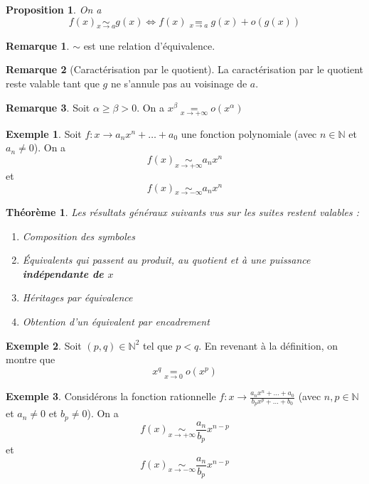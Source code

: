 \documentclass[french]{book}
\newcommand{\N}{\mathbb{N}}
\theoremstyle{plain}
\newtheorem{thm}{Théorème}[chapter]
\newtheorem{prop}{Proposition}[chapter]
\theoremstyle{definition}
\newtheorem{exa}{Exemple}[chapter]
\newtheorem{rmq}{Remarque}[chapter]
\theoremstyle{remark}
\begin{document}
\begin{prop}
	On a $$f(x)\underset{x\to a}{\sim}g(x) \Longleftrightarrow f(x)\underset{x\to a}{=}g(x)+o\left(g(x)\right)$$
\end{prop}
\begin{rmq}
	$\sim$ est une relation d'équivalence.
\end{rmq}
\begin{rmq}[Caractérisation par le quotient]
	La caractérisation par le quotient reste valable tant que $g$ ne s'annule pas au voisinage de $a$.
\end{rmq}
\begin{rmq}
	Soit $\alpha\geqslant\beta>0$. On a $x^\beta \underset{x\to+\infty}{=}o(x^\alpha)$
\end{rmq}
\begin{exa}
	Soit $f:x\rightarrow a_nx^n+\ldots+a_0$ une fonction polynomiale (avec $n\in\N$ et $a_n\ne 0$). On a $$f(x)\underset{x\to+\infty}{\sim}a_nx^n$$ et $$f(x)\underset{x\to-\infty}{\sim}a_nx^n$$
\end{exa}
\begin{thm}
	Les résultats généraux suivants vus sur les suites restent valables :
	\begin{enumerate}
		\item Composition des symboles
		\item Équivalents qui passent au produit, au quotient et à une puissance \textbf{indépendante de $x$}
		\item Héritages par équivalence
		\item Obtention d'un équivalent par encadrement
	\end{enumerate}
\end{thm}
\begin{exa}
	Soit $(p,q)\in\N^2$ tel que $p<q$. En revenant à la définition, on montre que $$x^q\underset{x\to 0}{=}o(x^p)$$
\end{exa}
\begin{exa}
	Considérons la fonction rationnelle $\displaystyle f:x\rightarrow\frac{a_nx^n+\ldots+a_0}{b_px^p+\ldots+b_0}$ (avec $n,p\in\N$ et $a_n\ne0$ et $b_p\ne0$). On a $$f(x)\underset{x\to+\infty}{\sim}\frac{a_n}{b_p}x^{n-p}$$ et $$f(x)\underset{x\to-\infty}{\sim}\frac{a_n}{b_p}x^{n-p}$$
\end{exa}
\end{document}
